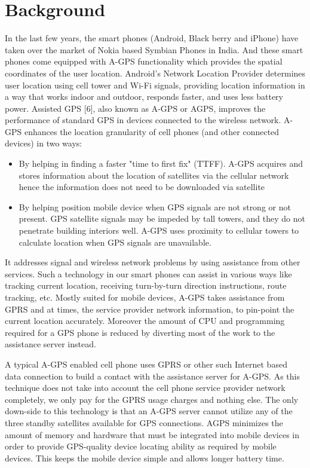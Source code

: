 	\section{Background}
	In the last few years, the smart phones (Android, Black 
	berry and iPhone) have taken over the market of Nokia 
	based Symbian Phones in India. And these smart phones 
	come equipped with A-GPS functionality which provides 
	the spatial coordinates of the user location. 
	Android's Network Location Provider determines user 
	location using cell tower and Wi-Fi signals, providing 
	location information in a way that works indoor and 
	outdoor, responds faster, and uses less battery power. 
	Assisted GPS [6], also known as A-GPS or AGPS, 
	improves the performance of standard GPS in devices 
	connected to the wireless network. A-GPS enhances the 
	location granularity of cell phones (and other connected 
	devices) in two ways: 
	
	\begin{itemize}
	\item By helping in finding a faster "time to first fix" 
	(TTFF). A-GPS acquires and stores information about 
	the location of satellites via the cellular network hence 
	the information does not need to be downloaded via 
	satellite
	\item By helping position mobile device when GPS signals 
	are not strong or not present. GPS satellite signals may 
	be impeded by tall towers, and they do not penetrate 
	building interiors well. A-GPS uses proximity to 
	cellular towers to calculate location when GPS signals 
	are unavailable. 
	\end{itemize}
	
	It addresses signal and wireless network problems by using 
	assistance from other services. Such a technology in our 
	smart phones can assist in various ways like tracking 
	current location, receiving turn-by-turn direction 
	instructions, route tracking, etc. Mostly suited for mobile devices, A-GPS takes assistance 
	from GPRS and at times, the service provider network 
	information, to pin-point the current location accurately. 
	Moreover the amount of CPU and programming required 
	for a GPS phone is reduced by diverting most of the work 
	to the assistance server instead. 
	
	A typical A-GPS enabled cell phone uses GPRS or other 
	such Internet based data connection to build a contact with 
	the assistance server for A-GPS. As this technique does 
	not take into account the cell phone service provider 
	network completely, we only pay for the GPRS usage 
	charges and nothing else. The only down-side to this 
	technology is that an A-GPS server cannot utilize any of 
	the three standby satellites available for GPS connections. 
	AGPS minimizes the amount of memory and hardware 
	that must be integrated into mobile devices in order to 
	provide GPS-quality device locating ability as required by 
	mobile devices. This keeps the mobile device simple and 
	allows longer battery time.
	
